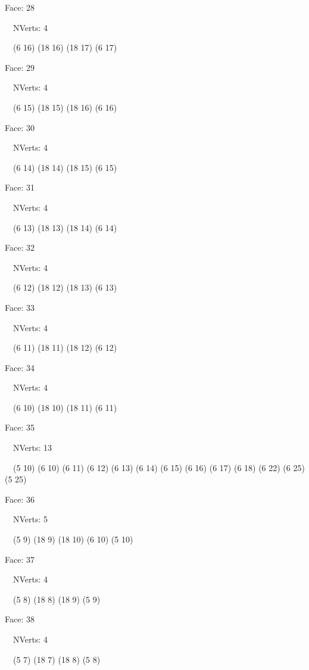 \documentclass{article}
\begin{document}
{\footnotesize 

Face: 28

\   \    NVerts: 4

 \   \   (6 16) (18 16) (18 17) (6 17)}

{\footnotesize 

Face: 29

\   \    NVerts: 4

 \   \   (6 15) (18 15) (18 16) (6 16)}

{\footnotesize 

Face: 30

\   \    NVerts: 4

 \   \   (6 14) (18 14) (18 15) (6 15)}

{\footnotesize 

Face: 31

\   \    NVerts: 4

 \   \   (6 13) (18 13) (18 14) (6 14)}

{\footnotesize 

Face: 32

\   \    NVerts: 4

 \   \   (6 12) (18 12) (18 13) (6 13)}

{\footnotesize 

Face: 33

\   \    NVerts: 4

 \   \   (6 11) (18 11) (18 12) (6 12)}

{\footnotesize 

Face: 34

\   \    NVerts: 4

 \   \   (6 10) (18 10) (18 11) (6 11)}

{\footnotesize 

Face: 35

\   \    NVerts: 13

 \   \   (5 10) (6 10) (6 11) (6 12) (6 13) (6 14) (6 15) (6 16) (6 17) (6 18) (6 22) (6 25) (5 25)}

{\footnotesize 

Face: 36

\   \    NVerts: 5

 \   \   (5 9) (18 9) (18 10) (6 10) (5 10)}

{\footnotesize 

Face: 37

\   \    NVerts: 4

 \   \   (5 8) (18 8) (18 9) (5 9)}

{\footnotesize 

Face: 38

\   \    NVerts: 4

 \   \   (5 7) (18 7) (18 8) (5 8)}
\end{document}
